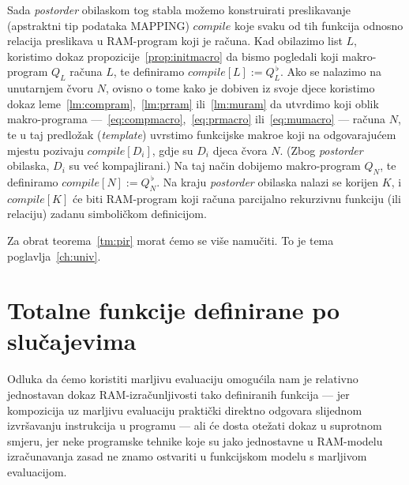 Sada \emph{postorder} obilaskom tog stabla možemo konstruirati preslikavanje (apstraktni tip podataka MAPPING) $compile$ koje svaku od tih funkcija odnosno relacija preslikava u RAM-program koji je računa. Kad obilazimo list $L$, koristimo dokaz propozicije~\ref{prop:initmacro} da bismo pogledali koji makro-program $Q_L$ računa $L$, te definiramo $compile[L]:=Q_L^{\,\flat}$. Ako se nalazimo na unutarnjem čvoru $N$\!, ovisno o tome kako je dobiven iz svoje djece koristimo dokaz leme~\ref{lm:compram},~\ref{lm:prram} ili~\ref{lm:muram} da utvrdimo koji oblik makro-programa ---~\eqref{eq:compmacro},~\eqref{eq:prmacro} ili~\eqref{eq:mumacro} --- računa $N$, te u taj predložak (\emph{template}) uvrstimo funkcijske makroe koji na odgovarajućem mjestu pozivaju $compile[D_i]$, gdje su $D_i$ djeca čvora $N$. (Zbog \emph{postorder} obilaska, $D_i$ su već kompajlirani.) Na taj način dobijemo makro-program $Q_N$, te definiramo $compile[N]:=Q_N^{\,\flat}$. Na kraju \emph{postorder} obilaska nalazi se korijen $K$, i $compile[K]$ će biti RAM-program koji računa parcijalno rekurzivnu funkciju (ili relaciju) zadanu simboličkom definicijom.

Za obrat teorema~\ref{tm:pir} morat ćemo se više namučiti. To je tema poglavlja~\ref{ch:univ}.

\section{Totalne funkcije definirane po slučajevima}\label{sec:grtot}

Odluka da ćemo koristiti marljivu evaluaciju omogućila nam je relativno jednostavan dokaz RAM-izračunljivosti tako definiranih funkcija --- jer kompozicija uz marljivu evaluaciju praktički direktno odgovara slijednom izvršavanju instrukcija u programu --- ali će dosta otežati dokaz u suprotnom smjeru, jer neke programske tehnike koje su jako jednostavne u RAM-modelu izračunavanja zasad ne znamo ostvariti u funkcijskom modelu s marljivom evaluacijom.

